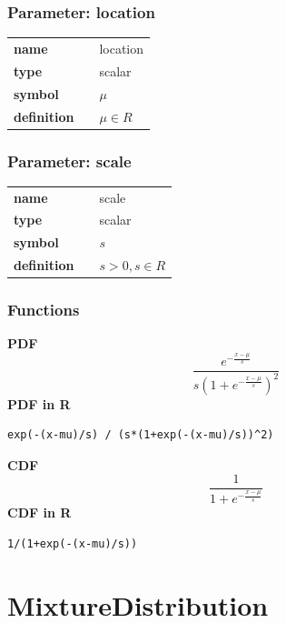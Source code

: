 \documentclass{article}
\begin{document}
\subsubsection*{Parameter: location}

\noindent\begin{tabular}{p{2cm}cl}
\textbf{name} & & location \\
\textbf{type} & & scalar \\
\textbf{symbol} & & $\mu$  \\
\textbf{definition} & & $\mu \in R$
\end{tabular}
\subsubsection*{Parameter: scale}

\noindent\begin{tabular}{p{2cm}cl}
\textbf{name} & & scale \\
\textbf{type} & & scalar \\
\textbf{symbol} & & $s$  \\
\textbf{definition} & & $s > 0, s \in R$
\end{tabular}
\subsubsection*{Functions}

\smallskip \noindent \hspace{.2cm} \textbf{PDF} 
\begin{equation*}\frac{e^{-\frac{x-\mu}{s}}} {s\left(1+e^{-\frac{x-\mu}{s}}\right)^2}\end{equation*}
\smallskip \noindent \hspace{.2cm} \textbf{PDF in R}  
\begin{verbatim}exp(-(x-mu)/s) / (s*(1+exp(-(x-mu)/s))^2)\end{verbatim}
\smallskip \noindent \hspace{.2cm} \textbf{CDF} 
\begin{equation*}\frac{1}{1+e^{-\frac{x-\mu}{s}}}\end{equation*}
\smallskip \noindent \hspace{.2cm} \textbf{CDF in R} 
\begin{verbatim}1/(1+exp(-(x-mu)/s))\end{verbatim}
\smallskip\section*{MixtureDistribution} 
\end{document}
